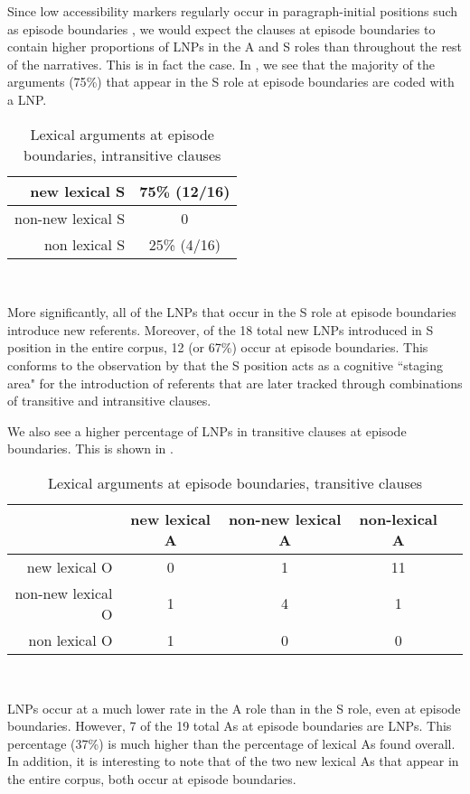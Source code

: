 Since low accessibility markers regularly occur in paragraph-initial positions such as episode boundaries \citep[52]{ariel2001}, we would expect the clauses at episode boundaries to contain higher proportions of LNPs in the A and S roles than throughout the rest of the narratives. This is in fact the case. In , we see that the majority of the arguments (75{\%}) that appear in the S role at episode boundaries are coded with a LNP. 
\begin{table}[htp] 
\begin{center}
\caption{\small{Lexical arguments at episode boundaries, intransitive clauses}}
\begin{tabular}{| r | c |}\hline
new lexical S & 75{\%} (12/16) \\
\hline
non-new lexical S & 0 \\
\hline
non lexical S & 25{\%} (4/16)  \\
\hline
\end{tabular}\\
\label{episodeintr}
\end{center}
\end{table}
More significantly, all of the LNPs that occur in the S role at episode boundaries introduce new referents. Moreover, of the 18 total new LNPs introduced in S position in the entire corpus, 12 (or 67{\%}) occur at episode boundaries. This conforms to the observation by \citet[831]{dubois1987} that the S position acts as a cognitive ``staging area" for the introduction of referents that are later tracked through combinations of transitive and intransitive clauses.

We also see a higher percentage of LNPs in transitive clauses at episode boundaries. This is shown in .
\begin{table}[htp]
\begin{center}
\caption{\small{Lexical arguments at episode boundaries, transitive clauses}}
\begin{tabular}{| r | c | c | c | c |}\hline
 & new lexical A & non-new lexical A & non-lexical A \\
\hline
new lexical O & 0 & 1 & 11 \\
\hline
non-new lexical O & 1 & 4  & 1  \\
\hline
non lexical O & 1 &  0 & 0  \\
\hline
\end{tabular}\\
\label{episodetr}
\end{center}
\end{table}
LNPs occur at a much lower rate in the A role than in the S role, even at episode boundaries. However, 7 of the 19 total As at episode boundaries are LNPs. This percentage (37{\%}) is much higher than the percentage of lexical As found overall. In addition, it is interesting to note that of the two new lexical As that appear in the entire corpus, both occur at episode boundaries. 

